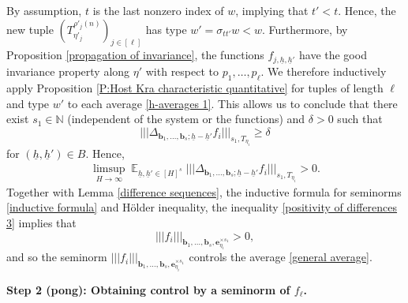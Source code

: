 \documentclass[11pt]{amsart}
\theoremstyle{definition}
\newcommand{\N}{{\mathbb N}}
\newcommand{\be}{{\mathbf{e}}}
\renewcommand{\b}{{\textbf{b}}}
\newcommand{\uh}{{\underline{h}}}
\newcommand{\nnorm}[1]{\lvert\!|\!| #1|\!|\!\rvert}
\DeclareMathOperator*{\E}{\mathbb{E}}
\newcommand{\brac}[1]{\mathopen{}\left( #1 \mathclose{}\right)}
\begin{document}
By assumption, $t$ is the last nonzero index of $w$, implying that $t'<t$. Hence, the new tuple $\brac{T_{\eta'_j}^{\rho'_j(n)}}_{j\in[\ell]}$ has type $w'=\sigma_{tt'}w<w$. Furthermore, by Proposition \ref{propagation of invariance}, the functions $f_{j, \uh, \uh'}$ have the good invariance property along $\eta'$ with respect to $p_1, \ldots, p_\ell$. We therefore inductively apply Proposition \ref{P:Host Kra characteristic quantitative} for tuples of length $\ell$ and type $w'$ to each average \eqref{h-averages 1}. This allows us to conclude that there exist $s_1\in\N$ (independent of the system or the functions) and $\delta>0$ such that
$$\nnorm{\Delta_{{\b_1}, \ldots, {\b_s}; \uh-\uh'} f_i}_{s_1, T_{\eta_i}} \geq \delta$$
for $(\uh, \uh')\in B$.
Hence,
\begin{align}\label{positivity of differences 3}
	\limsup_{H\to\infty}\E_{\uh,\uh'\in [H]^{s}} \nnorm{\Delta_{{\b_1}, \ldots, {\b_s}; \uh-\uh'} f_i}_{s_1, T_{\eta_i}}>0.
\end{align}
Together with Lemma \ref{difference sequences}, the inductive formula for seminorms \eqref{inductive formula}  and H\"older inequality, the inequality \eqref{positivity of differences 3}  implies that
$$
\nnorm{f_i}_{{\b_1}, \ldots, {\b_s}, \be_{\eta_i}^{\times s_1}}>0,
$$
and so the seminorm $\nnorm{f_i}_{{\b_1}, \ldots, {\b_s}, \be_{\eta_i}^{\times s_1}}$ controls the average \eqref{general average}.

\textbf{Step 2 (pong): Obtaining control by a seminorm of $f_\ell$.}
~\
\end{document}

